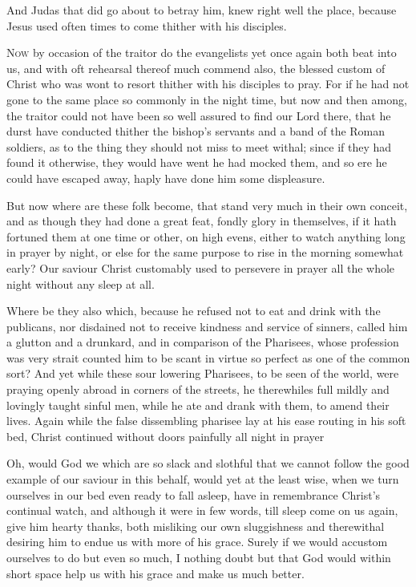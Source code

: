 \documentclass[a5paper]{scrbook}
\begin{document}
	\begin{scripture}[John 18:2]
		And Judas that did go about to betray him, knew right well the place, because Jesus used often times to come thither with his disciples.
	\end{scripture}
	
	\vspace{10mm}
	
	\lettrine{N}{ow} by occasion of the traitor do the evangelists yet once again both beat into us, and with oft rehearsal thereof much commend also, the blessed custom of Christ who was wont to resort thither with his disciples to pray. For if he had not gone to the same place so commonly in the night time, but now and then among, the traitor could not have been so well assured to find our Lord there, that he durst have conducted thither the bishop's servants and a band of the Roman soldiers, as to the thing they should not miss to meet withal; since if they had found it otherwise, they would have went he had mocked them, and so ere he could have escaped away, haply have done him some displeasure.
	
	But now where are these folk become, that stand very much in their own conceit, and as though they had done a great feat, fondly glory in themselves, if it hath fortuned them at one time or other, on high evens, either to watch anything long in prayer by night, or else for the same purpose to rise in the morning somewhat early? Our saviour Christ customably used to persevere in prayer all the whole night without any sleep at all.
	
	Where be they also which, because he refused not to eat and drink with the publicans, nor disdained not to receive kindness and service of sinners, called him a glutton and a drunkard, and in
	comparison of the Pharisees, whose profession was very strait counted him to be scant in virtue so perfect as one of the common sort? And yet while these sour lowering Pharisees, to be seen of the world, were praying openly abroad in corners of the streets, he therewhiles full mildly and lovingly taught sinful men, while he ate and drank with them, to amend their lives. Again while the false dissembling pharisee lay at his ease routing in his soft bed, Christ continued without doors painfully all night in prayer
	
	Oh, would God we which are so slack and slothful that we cannot follow the good example of our saviour in this behalf, would yet at the least wise, when we turn ourselves in our bed even ready to fall asleep, have in remembrance Christ's continual watch, and although it were in few words, till sleep come on us again, give him hearty thanks, both misliking our own sluggishness and therewithal desiring him to endue us with more of his grace. Surely if we would accustom ourselves to do but even so much, I nothing doubt but that God would within short space help us with his grace and make us much better.
	
\end{document}
